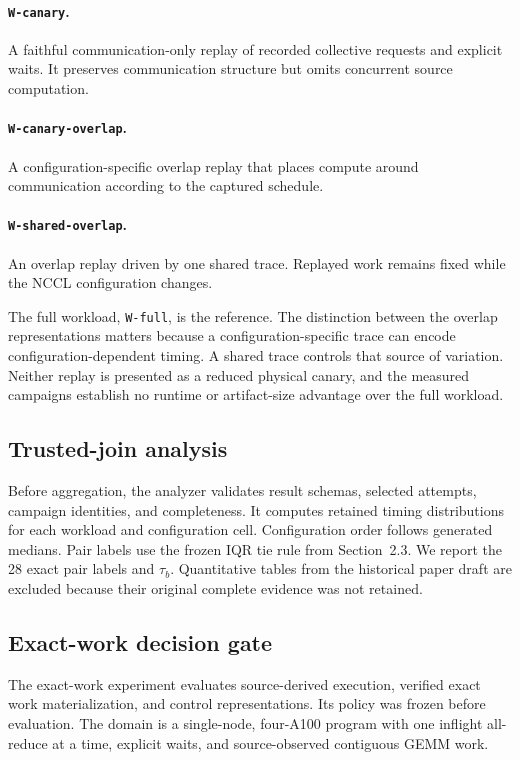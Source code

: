 \documentclass[10pt,twocolumn]{article}
\newcommand{\wname}[1]{\texttt{W-#1}}
\begin{document}
\paragraph{\wname{canary}.} A faithful communication-only replay of recorded
collective requests and explicit waits. It preserves communication structure
but omits concurrent source computation.

\paragraph{\wname{canary-overlap}.} A configuration-specific overlap replay
that places compute around communication according to the captured schedule.

\paragraph{\wname{shared-overlap}.} An overlap replay driven by one shared
trace. Replayed work remains fixed while the NCCL configuration changes.

The full workload, \wname{full}, is the reference. The distinction between the
overlap representations matters because a configuration-specific trace can
encode configuration-dependent timing. A shared trace controls that source of
variation. Neither replay is presented as a reduced physical canary, and the
measured campaigns establish no runtime or artifact-size advantage over the
full workload.

\subsection{Trusted-join analysis}

Before aggregation, the analyzer validates result schemas, selected attempts,
campaign identities, and completeness. It computes retained timing
distributions for each workload and configuration cell. Configuration order
follows generated medians. Pair labels use the frozen IQR tie rule from
Section~2.3. We report the 28 exact pair labels and $\tau_b$. Quantitative
tables from the historical paper draft are excluded because their original
complete evidence was not retained.

\subsection{Exact-work decision gate}

The exact-work experiment evaluates source-derived execution, verified exact
work materialization, and control representations. Its policy was frozen
before evaluation. The domain is a single-node, four-A100 program with one
inflight all-reduce at a time, explicit waits, and source-observed contiguous
GEMM work.
\end{document}
